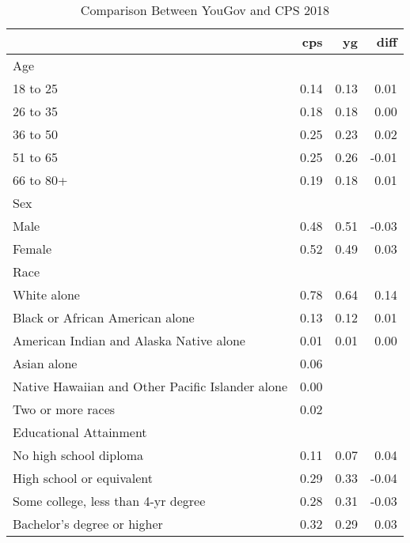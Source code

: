 \begin{table}[!htb]
\centering
\caption{Comparison Between YouGov and CPS 2018} 
\label{table:cps_yg}
\begingroup\small
\begin{tabular}{lrrr}
  \hline
 & cps & yg & diff \\ 
  \hline
Age &  &  &  \\ 
  18 to 25 & 0.14 & 0.13 & 0.01 \\ 
  26 to 35 & 0.18 & 0.18 & 0.00 \\ 
  36 to 50 & 0.25 & 0.23 & 0.02 \\ 
  51 to 65 & 0.25 & 0.26 & -0.01 \\ 
  66 to 80+ & 0.19 & 0.18 & 0.01 \\ 
  Sex &  &  &  \\ 
  Male & 0.48 & 0.51 & -0.03 \\ 
  Female & 0.52 & 0.49 & 0.03 \\ 
  Race &  &  &  \\ 
  White alone & 0.78 & 0.64 & 0.14 \\ 
  Black or African American alone & 0.13 & 0.12 & 0.01 \\ 
  American Indian and Alaska Native alone & 0.01 & 0.01 & 0.00 \\ 
  Asian alone & 0.06 &  &  \\ 
  Native Hawaiian and Other Pacific Islander alone & 0.00 &  &  \\ 
  Two or more races & 0.02 &  &  \\ 
  Educational Attainment &  &  &  \\ 
  No high school diploma & 0.11 & 0.07 & 0.04 \\ 
  High school or equivalent & 0.29 & 0.33 & -0.04 \\ 
  Some college, less than 4-yr degree & 0.28 & 0.31 & -0.03 \\ 
  Bachelor's degree or higher & 0.32 & 0.29 & 0.03 \\ 
   \hline
\end{tabular}
\endgroup
\end{table}
